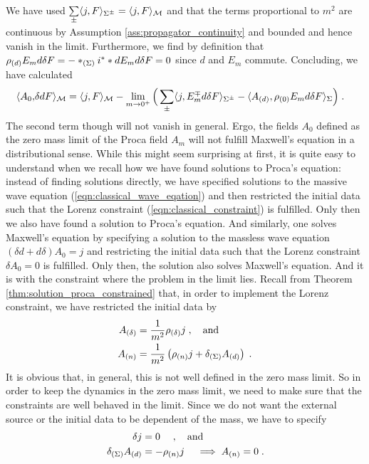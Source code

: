 We have used $\sum\limits_\pm \langle j , F\rangle_{\Sigma^\pm} = \langle j , F\rangle_{\mathcal{M}}$ and that the terms proportional to $m^2$ are continuous by Assumption \ref{ass:propagator_continuity} and bounded and hence vanish in the limit. Furthermore, we find by definition that $\rho_{(d)} E_m d\delta  F = - *_{(\Sigma)}i^* * d E_m d \delta F = 0$ since $d$ and $E_m$ commute. Concluding, we have calculated
\begin{align} \label{eqn:dynamics_limit_classical_unconstraint}
\langle A_0 , &\delta d F \rangle_{\mathcal{M}} =  \langle j , F \rangle_{\mathcal{M}} - \lim\limits_{m \to 0^+}\Big(\sum\limits_\pm \langle j ,  E_m^\mp d\delta F   \rangle_{\Sigma^\pm}
- \langle {A_{(d)}} , \rho_{(0)} E_m d\delta  F \rangle_\Sigma \Big) \;.
\end{align}
The second term though will not vanish in general. Ergo, the fields $A_0$ defined as the zero mass limit of the Proca field $A_m$ will not fulfill Maxwell's equation in a distributional sense. While this might seem surprising at first, it is quite easy to understand when we recall how we have found solutions to Proca's equation: instead of finding solutions directly, we have specified solutions to the massive wave equation (\ref{eqn:classical_wave_eqation}) and then restricted the initial data such that the Lorenz constraint (\ref{eqn:classical_constraint}) is fulfilled. Only then we also have found a solution to Proca's equation. And similarly, one solves Maxwell's equation by specifying a solution to the massless wave equation $(\delta d + d \delta )A_0 = j$ and restricting the initial data such that the Lorenz constraint $\delta A_0 = 0$ is fulfilled. Only then, the solution also solves Maxwell's equation. And it is with the constraint where the problem in the limit lies. Recall from Theorem \ref{thm:solution_proca_constrained} that, in order to implement the Lorenz constraint, we have restricted the initial data by
\begin{align}
	{A_{(\delta)}} &= \frac{1}{m^2}\rho_{(\delta)} j \; , \quad \text{and} \\
	{A_{(n)}} &= \frac{1}{m^2}\left( \rho_{(n)} j  + \delta_{(\Sigma)} {A_{(d)}} \right) \;.
\end{align}
It is obvious that, in general, this is not well defined in the zero mass limit. So in order to keep the dynamics in the zero mass limit, we need to make sure that the constraints are well behaved in the limit. Since we do not want the external source or the initial data to be dependent of the mass, we have to specify
\begin{align}
	\delta j &= 0 \quad \; , \quad \text{and} \\
	\delta_{(\Sigma)} {A_{(d)}} &= -\rho_{(n)} j \quad \implies {A_{(n)}} =0 \;.
\end{align}
